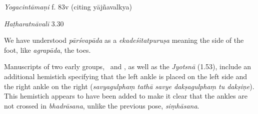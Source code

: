 \begin{ekdosis}
\begin{sources}[hp01_053]
\end{sources}

\begin{testimonia}[hp01_053]
\emph{Yogacintāmaṇi} f. 83v (citing yājñavalkya)

\begin{versinnote}
\end{versinnote}

\emph{Haṭharatnāvalī} 3.30 

\begin{versinnote}
\end{versinnote}

\end{testimonia}

\begin{philcomm}[hp01_053]
We have understood \emph{pārśvapāda} as a \emph{ekadeśitatpuruṣa} meaning the side of the foot, like  \emph{agrapāda}, the toes.

Manuscripts of two early groups, \textbeta\ and \textgamma, as well as the \emph{Jyotsnā} (1.53), include an additional hemistich specifying that the left ankle is placed on the left side and the right ankle on the right (\emph{savyagulphaṃ tathā savye dakṣagulphaṃ tu dakṣiṇe}). This hemistich appears to have been added to make it clear that the ankles are not crossed in \emph{bhadrāsana}, unlike the previous pose, \emph{siṃhāsana}.

\end{philcomm}





\end{ekdosis}
